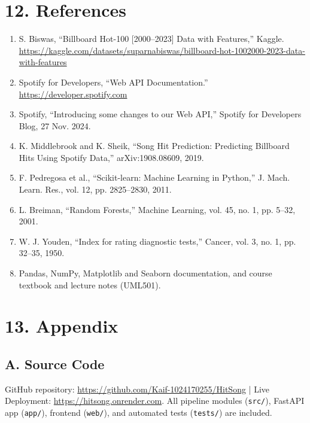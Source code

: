 \documentclass[11pt,a4paper]{article}
\begin{document}
\section*{12. References}
\begin{enumerate}
  \item[{[1]}] S. Biswas, ``Billboard Hot-100 [2000--2023] Data with Features,'' Kaggle. \url{https://kaggle.com/datasets/suparnabiswas/billboard-hot-1002000-2023-data-with-features}
  \item[{[2]}] Spotify for Developers, ``Web API Documentation.'' \url{https://developer.spotify.com}
  \item[{[3]}] Spotify, ``Introducing some changes to our Web API,'' Spotify for Developers Blog, 27 Nov. 2024.
  \item[{[4]}] K. Middlebrook and K. Sheik, ``Song Hit Prediction: Predicting Billboard Hits Using Spotify Data,'' arXiv:1908.08609, 2019.
  \item[{[5]}] F. Pedregosa et al., ``Scikit-learn: Machine Learning in Python,'' J. Mach. Learn. Res., vol. 12, pp. 2825--2830, 2011.
  \item[{[6]}] L. Breiman, ``Random Forests,'' Machine Learning, vol. 45, no. 1, pp. 5--32, 2001.
  \item[{[7]}] W. J. Youden, ``Index for rating diagnostic tests,'' Cancer, vol. 3, no. 1, pp. 32--35, 1950.
  \item[{[8]}] Pandas, NumPy, Matplotlib and Seaborn documentation, and course textbook and lecture notes (UML501).
\end{enumerate}

\newpage
\section*{13. Appendix}
\subsection*{A. Source Code}
GitHub repository: \url{https://github.com/Kaif-1024170255/HitSong} | Live Deployment: \url{https://hitsong.onrender.com}. All pipeline modules (\texttt{src/}), FastAPI app (\texttt{app/}), frontend (\texttt{web/}), and automated tests (\texttt{tests/}) are included.
\end{document}
